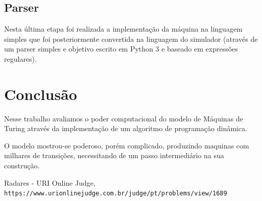 \documentclass[a4paper]{article}
\begin{document}
\subsection{Parser}

Nesta última etapa foi realizada a implementação da máquina na linguagem simples que foi posteriormente convertida na linguagem do simulador (através de um parser simples e objetivo escrito em Python 3 e baseado em expressões regulares).

\section{Conclusão}

Nesse trabalho avaliamos o poder computacional do modelo de Máquinas de Turing através da implementação de um algoritmo de programação dinâmica.

O modelo mostrou-se poderoso, porém complicado, produzindo maquinas com milhares de transições, necessitando de um passo intermediário na sua construção.


\medskip
\begin{thebibliography}{9}
Radares - URI Online Judge,
\\\texttt{https://www.urionlinejudge.com.br/judge/pt/problems/view/1689}
\end{thebibliography}
\end{document}
